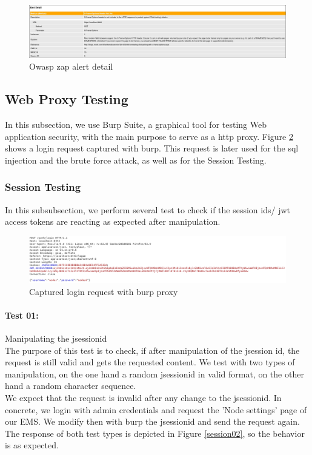 \documentclass{scrreprt}
\begin{document}
\begin{figure}[h!]
	\centering
	\includegraphics[width=17cm]{report/owasp.jpg}
	\caption{Owasp zap alert detail}
	\label{zap1}
\end{figure}


\subsection{Web Proxy Testing}

In this subsection, we use Burp Suite, a graphical tool for testing Web application security, with the main purpose to serve as a http proxy. Figure \ref{request} shows a login request captured with burp. This request is later used for the sql injection and the brute force attack, as well as for the Session Testing.

\subsubsection{Session Testing}
 In this subsubsection, we perform several test to check if the session ids/ jwt access tokens are reacting as expected after manipulation.

\begin{figure}[h!]
	\centering
	\includegraphics[width=17cm]{report/log.png}
	\caption{Captured login request with burp proxy}
	\label{request}
\end{figure}

\paragraph{Test 01:} Manipulating the jsessionid \\
The purpose of this test is to check, if after manipulation of the jsession id, the request is still valid and gets the requested content. We test with two types of manipulation, on the one hand a random jsessionid in valid format, on the other hand a random character sequence. \\
We expect that the request is invalid after any change to the jsessionid.
In concrete, we login with admin credentials and request the 'Node settings' page of our EMS. We modify then with burp the jsessionid and send the request again.\\
The response of both test types is depicted in Figure \ref{session02}, so the behavior is as expected. 
\end{document}
